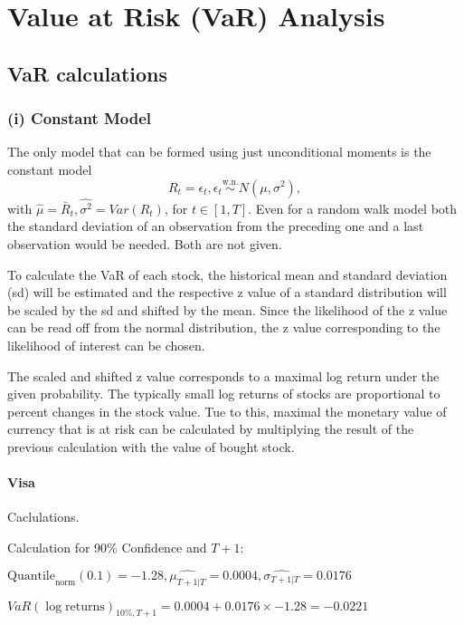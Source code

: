 \section{Value at Risk (VaR) Analysis}
\label{sec:q2_value_at_risk_analysis}
\subsection{VaR calculations}
\subsubsection{(i) Constant Model}

The only model that can be formed using just unconditional moments is the constant model $$R_t = \epsilon_t, \epsilon_t \overset{\text{w.n.}}{\sim} N(\mu, \sigma^2),$$
with $\hat \mu = \bar R_t, \hat{\sigma^2} = Var(R_t)$, for $t \in [1,T]$. 
Even for a random walk model both the standard deviation of an observation from the preceding one and a last observation would be needed. Both are not given.


To calculate the VaR of each stock, the historical mean and standard deviation (sd) will be estimated and the respective z value of a standard distribution will be scaled by the sd and shifted by the mean. 
Since the likelihood of the z value can be read off from the normal distribution, the z value corresponding to the likelihood of interest can be chosen.


The scaled and shifted z value corresponds to a maximal log return under the given probability. The typically small log returns of stocks are proportional to percent changes in the stock value. Tue to this, maximal the monetary value of currency that is at risk can be calculated by multiplying the result of the previous calculation with the value of bought stock.
\paragraph{Visa} Caclulations.\newline \indent 





Calculation for 90\% Confidence and $T+1$:

\indent\indent $\text{Quantile}_\text{norm}(0.1) = -1.28,\hat{\mu_{T+1|T}} = 0.0004, \hat{\sigma_{T+1|T}} = 0.0176$

\indent\indent $VaR(\log \text{returns})_{10\%, T + 1} = 0.0004 + 0.0176\times-1.28 = -0.0221$

